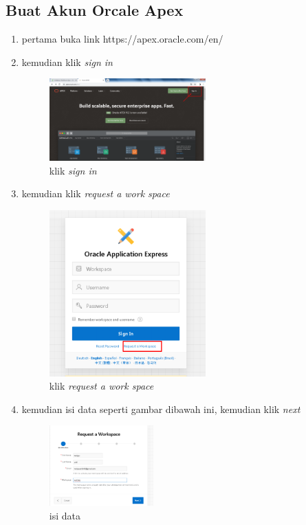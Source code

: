 \documentclass{article}
\begin{document}
\subsection{Buat Akun Orcale Apex}
\begin{enumerate}
\item pertama buka link https://apex.oracle.com/en/
\item kemudian klik \textit{sign in}

    \begin{figure}[ht]
        \centerline{\includegraphics[width=6cm]{a.png}}
        \caption{klik \textit{sign in}}
    \end{figure}

\item kemudian klik \textit{request a work space}

    \begin{figure}[ht]
        \centerline{\includegraphics[width=6cm]{b.png}}
        \caption{klik \textit{request a work space}}
    \end{figure}
    
\item kemudian isi data seperti gambar dibawah ini, kemudian klik \textit{next}
    \begin{figure}[ht]
        \centerline{\includegraphics[width=4cm]{c.png}}
        \caption{isi data}
    \end{figure}
    

\end{enumerate}
\end{document}
